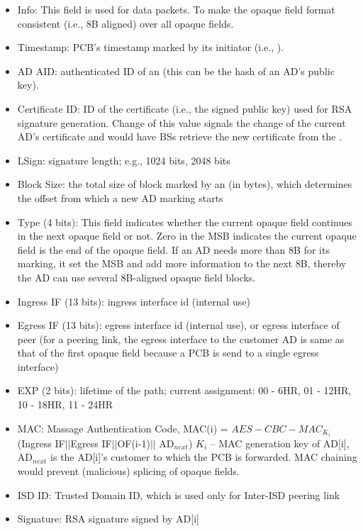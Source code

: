 \begin{itemize}
\item{Info: }This field is used for data packets. To make the opaque field format consistent (i.e., 8B aligned) over all opaque fields.
\item{Timestamp: }PCB's timestamp marked by its initiator (i.e., \ISDC \BS).
\item{AD AID: } authenticated ID of an \AD (this can be the hash of an AD's public key).
\item{Certificate ID: } ID of the certificate (i.e., the signed public key) used for RSA signature generation. Change of this value signals the change of the current AD's certificate and would have BSs retrieve the new certificate from the \CS.
\item{LSign: } signature length; e.g., 1024 bits, 2048 bits
\item{Block Size: } the total size of block marked by an \AD (in bytes), which determines the offset from which a new AD marking starts
\item{Type (4 bits): } This field indicates whether the current opaque field continues in the next opaque field or not. Zero in the MSB indicates the current opaque field is the end of the opaque field. If an AD needs more than 8B for its marking, it set the MSB and add more information to the next 8B, thereby the AD can use several 8B-aligned opaque field blocks. 
\item{Ingress IF (13 bits): } ingress interface id (internal use)
\item{Egress IF (13 bits): } egress interface id (internal use), or egress interface of peer (for a peering link, the egress interface to the customer AD is same as that of the first opaque field because a PCB is send to a single egress interface)
\item{EXP (2 bits): } lifetime of the path; current assignment: 00 - 6HR, 01 - 12HR, 10 - 18HR, 11 - 24HR
\item{MAC: } Massage Authentication Code, MAC(i) = $AES-CBC-MAC_{K_i}$(Ingress IF$||$Egress IF$||$OF(i-1)$||$ AD$_{next}$) \newline
	$K_i$ – MAC generation key of AD[i], AD$_{next}$ is the AD[i]'s customer to which the PCB is forwarded. MAC chaining would prevent (malicious) splicing of opaque fields.
\item{ISD ID: } Trusted Domain ID, which is used only for Inter-ISD peering link
\item{Signature: } RSA signature signed by AD[i]
\end{itemize}

